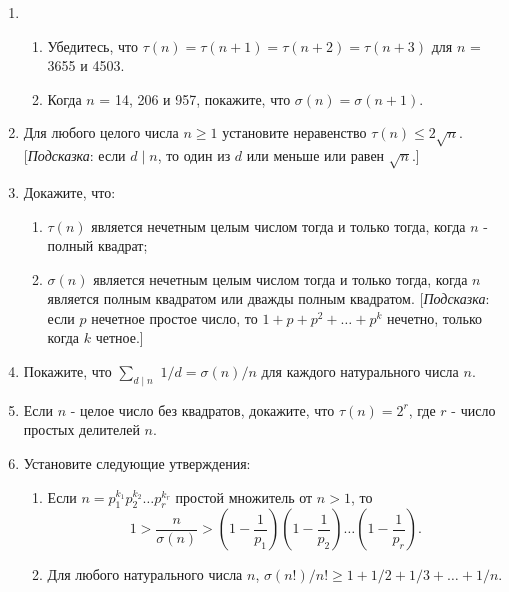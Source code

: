 \documentclass[11pt]{article}
\begin{document}
\begin{enumerate}
	\item
	\begin{enumerate} 
	    \item Убедитесь, что $\tau(n) = \tau(n+1) = \tau(n+2) = \tau(n+3)$ для $n$ = 3655 и 4503.
        \item Когда $n$ = 14, 206 и 957, покажите, что $\sigma(n) = \sigma(n+1)$.
    \end{enumerate}
    \item Для любого целого числа $n \ge 1$ установите неравенство $\tau(n)\le 2\sqrt{n}$. [{\itshape Подсказка}: если
    $d\mid n$, то один из $d$ или меньше или равен $\sqrt{n}$.]
    \item Докажите, что:
    \begin{enumerate} 
    	\item $\tau(n)$ является нечетным целым числом тогда и только тогда, когда $n$ - полный квадрат;
    	\item $\sigma(n)$ является нечетным целым числом тогда и только тогда, когда $n$ является полным квадратом или дважды полным квадратом. [{\itshape Подсказка}: если $p$ нечетное простое число, то $1+p+p^{2}+\ldots+p^{k}$ нечетно, только когда $k$ четное.]
    \end{enumerate}
    \item Покажите, что $\sum_{d\mid n}$ $1/d=\sigma(n)/n$ для каждого натурального числа $n$.
    \item Если $n$ - целое число без квадратов, докажите, что $\tau(n) = 2^{r}$, где $r$ - число простых делителей $n$.
    \item Установите следующие утверждения: 
    \begin{enumerate} 
    	\item Если $n = p_{1}^{k_{1}}p_{2}^{k_{2}}\ldots p_{r}^{k_{r}}$ простой множитель от $n > 1$, то
    	$$1 > \frac{n}{\sigma(n)} > \left (1 - \frac{1}{p_{1}}\right)\left (1 - \frac{1}{p_{2}}\right)\ldots \left (1 - \frac{1}{p_{r}}\right).$$
    	\item Для любого натурального числа $n$,  $\sigma(n!)/n!\ge1+1/2+1/3+\ldots+1/n.$
    	

\end{enumerate}
\end{enumerate}
\end{document}
